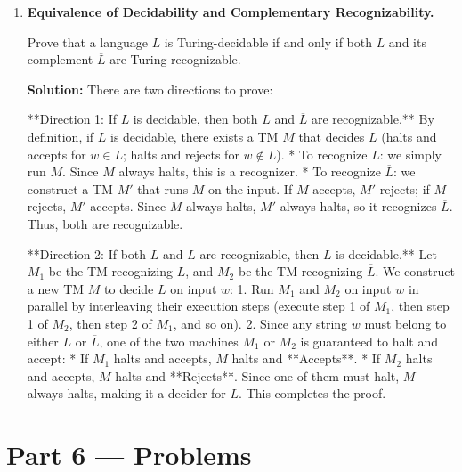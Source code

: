\documentclass[12pt, a4paper]{book}
\begin{document}
\begin{problembox}
\begin{enumerate}[label=\textbf{E\arabic*.}]
  \item \textbf{Equivalence of Decidability and Complementary Recognizability.}
  
        Prove that a language $L$ is Turing-decidable if and only if both $L$ and its complement $\overline{L}$ are Turing-recognizable.
        
        \textbf{Solution:}
        There are two directions to prove:
        
        **Direction 1: If $L$ is decidable, then both $L$ and $\overline{L}$ are recognizable.**
        By definition, if $L$ is decidable, there exists a TM $M$ that decides $L$ (halts and accepts for $w \in L$; halts and rejects for $w \notin L$).
        * To recognize $L$: we simply run $M$. Since $M$ always halts, this is a recognizer.
        * To recognize $\overline{L}$: we construct a TM $M'$ that runs $M$ on the input. If $M$ accepts, $M'$ rejects; if $M$ rejects, $M'$ accepts. Since $M$ always halts, $M'$ always halts, so it recognizes $\overline{L}$.
        Thus, both are recognizable.
        
        **Direction 2: If both $L$ and $\overline{L}$ are recognizable, then $L$ is decidable.**
        Let $M_1$ be the TM recognizing $L$, and $M_2$ be the TM recognizing $\overline{L}$.
        We construct a new TM $M$ to decide $L$ on input $w$:
        1. Run $M_1$ and $M_2$ on input $w$ in parallel by interleaving their execution steps (execute step 1 of $M_1$, then step 1 of $M_2$, then step 2 of $M_1$, and so on).
        2. Since any string $w$ must belong to either $L$ or $\overline{L}$, one of the two machines $M_1$ or $M_2$ is guaranteed to halt and accept:
           * If $M_1$ halts and accepts, $M$ halts and **Accepts**.
           * If $M_2$ halts and accepts, $M$ halts and **Rejects**.
        Since one of them must halt, $M$ always halts, making it a decider for $L$.
        This completes the proof.
\end{enumerate}
\end{problembox}

\newpage

\section{Part 6 --- Problems}
\end{document}
